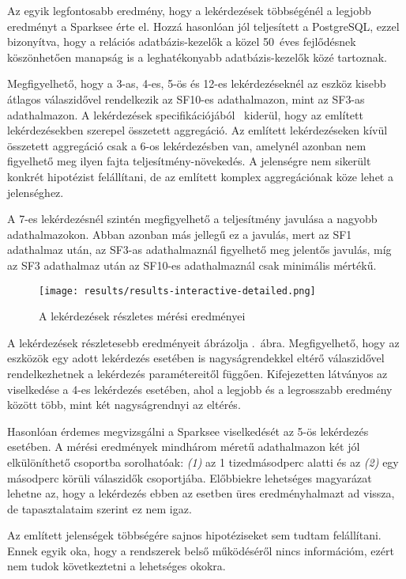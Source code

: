 Az egyik legfontosabb eredmény, hogy a lekérdezések többségénél a legjobb eredményt a Sparksee érte el. Hozzá hasonlóan jól teljesített a PostgreSQL, ezzel bizonyítva, hogy a relációs adatbázis-kezelők a közel 50~éves fejlődésnek köszönhetően manapság is a leghatékonyabb adatbázis-kezelők közé tartoznak.

Megfigyelhető, hogy a 3-as, 4-es, 5-ös és 12-es lekérdezéseknél az \virtuoso eszköz kisebb átlagos válaszidővel rendelkezik az SF10-es adathalmazon, mint az SF3-as adathalmazon. A lekérdezések specifikációjából~\cite{LDBC_SNB} kiderül, hogy az említett lekérdezésekben szerepel összetett aggregáció. Az említett lekérdezéseken kívül összetett aggregáció csak a 6-os lekérdezésben van, amelynél azonban nem figyelhető meg ilyen fajta teljesítmény-növekedés. A jelenségre nem sikerült konkrét hipotézist felállítani, de az említett komplex aggregációnak köze lehet a jelenséghez.

A 7-es lekérdezésnél szintén megfigyelhető a teljesítmény javulása a nagyobb adathalmazokon. Abban azonban más jellegű ez a javulás, mert az SF1 adathalmaz után, az SF3-as adathalmaznál figyelhető meg jelentős javulás, míg az SF3 adathalmaz után az SF10-es adathalmaznál csak minimális mértékű.

\begin{figure}
	\centering
	\texttt{[image: results/results-interactive-detailed.png]}
	\caption{A lekérdezések részletes mérési eredményei}
	\label{fig:results-interactive-detailed}
\end{figure}

A lekérdezések részletesebb eredményeit ábrázolja .~ábra. Megfigyelhető, hogy az eszközök egy adott lekérdezés esetében is nagyságrendekkel eltérő válaszidővel rendelkezhetnek a lekérdezés paramétereitől függően. Kifejezetten látványos az \virtuoso viselkedése a 4-es lekérdezés esetében, ahol a legjobb és a legrosszabb eredmény között több, mint két nagyságrendnyi az eltérés.

Hasonlóan érdemes megvizsgálni a Sparksee viselkedését az 5-ös lekérdezés esetében. A mérési eredmények mindhárom méretű adathalmazon két jól elkülöníthető csoportba sorolhatóak: \textit{(1)} az 1 tizedmásodperc alatti és az \textit{(2)} egy másodperc körüli válaszidők csoportjába. Előbbiekre lehetséges magyarázat lehetne az, hogy a lekérdezés ebben az esetben üres eredményhalmazt ad vissza, de tapasztalataim szerint ez nem igaz.

Az említett jelenségek többségére sajnos hipotéziseket sem tudtam felállítani. Ennek egyik oka, hogy a rendszerek belső működéséről nincs információm, ezért nem tudok következtetni a lehetséges okokra.

